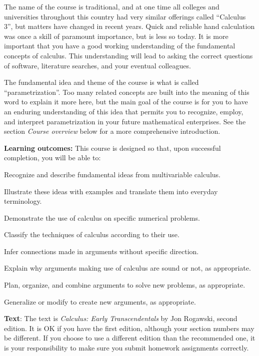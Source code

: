 \documentclass[12pt,twoside]{amsart}
\begin{document}
The name of the course is traditional, and at one time all colleges and universities throughout this country had very similar offerings called ``Calculus 3'', but matters have changed in recent years. Quick and reliable hand calculation was once a skill of paramount importance, but is less so today. It is more important that you have a good working understanding of the fundamental concepts of calculus. This understanding will lead to asking the correct questions of software, literature searches, and your eventual colleagues.

The fundamental idea and theme of the course is what is called ``parametrization''. Too many related concepts are built into the meaning of this word to explain it more here, but the main goal of the course is for you to have an enduring understanding of this idea that permits you to recognize, employ, and interpret parametrization in your future mathematical enterprises. See the section \emph{Course overview} below for a more comprehensive introduction.

\textbf{Learning outcomes:} This course is designed so that, upon successful completion, you will be able to:
\begin{compactitem}
    \item Recognize and describe fundamental ideas from multivariable calculus.
    \item Illustrate these ideas with examples and translate them into everyday terminology.
    \item Demonstrate the use of calculus on specific numerical problems.
    \item Classify the techniques of calculus according to their use.
    \item Infer connections made in arguments without specific direction.
    \item Explain why arguments making use of calculus are sound or not, as appropriate.
    \item Plan, organize, and combine arguments to solve new problems, as appropriate.
    \item Generalize or modify to create new arguments, as appropriate.
\end{compactitem}

\textbf{Text}: The text is \emph{Calculus: Early Transcendentals} by Jon Rogawski, second edition. It is OK if you have the first edition, although your section numbers may be different. If you choose to use a different edition than the recommended one, it is your responsibility to make sure you submit homework assignments correctly. 
\end{document}
